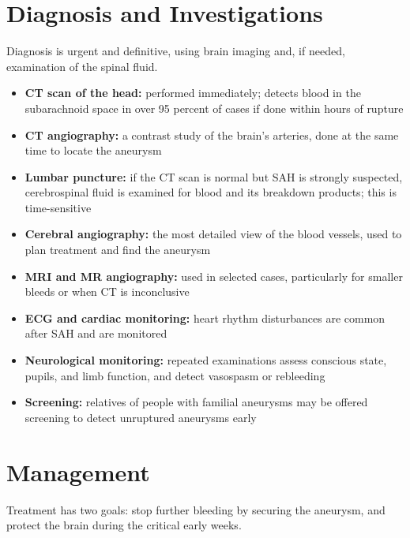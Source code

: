 \section*{Diagnosis and Investigations}
Diagnosis is urgent and definitive, using brain imaging and, if needed, examination of the spinal fluid.

\begin{itemize}
    \item \textbf{CT scan of the head:} performed immediately; detects blood in the subarachnoid space in over 95 percent of cases if done within hours of rupture
    \item \textbf{CT angiography:} a contrast study of the brain's arteries, done at the same time to locate the aneurysm
    \item \textbf{Lumbar puncture:} if the CT scan is normal but SAH is strongly suspected, cerebrospinal fluid is examined for blood and its breakdown products; this is time-sensitive
    \item \textbf{Cerebral angiography:} the most detailed view of the blood vessels, used to plan treatment and find the aneurysm
    \item \textbf{MRI and MR angiography:} used in selected cases, particularly for smaller bleeds or when CT is inconclusive
    \item \textbf{ECG and cardiac monitoring:} heart rhythm disturbances are common after SAH and are monitored
    \item \textbf{Neurological monitoring:} repeated examinations assess conscious state, pupils, and limb function, and detect vasospasm or rebleeding
    \item \textbf{Screening:} relatives of people with familial aneurysms may be offered screening to detect unruptured aneurysms early
\end{itemize}

\section*{Management}
Treatment has two goals: stop further bleeding by securing the aneurysm, and protect the brain during the critical early weeks.

